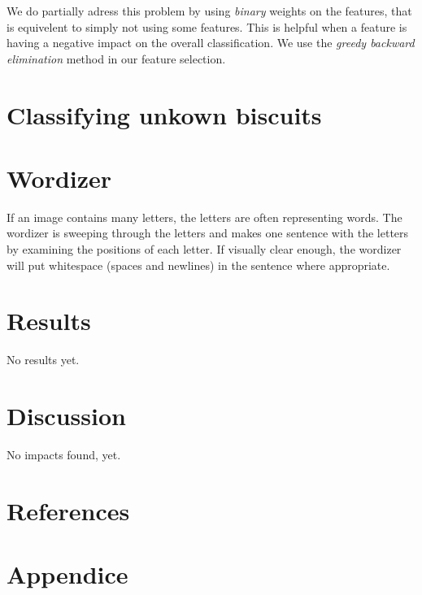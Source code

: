 \documentclass[a4paper,11pt]{article}
\begin{document}
We do partially adress this problem by using \emph{binary} weights on the features, 
that is equivelent to simply not using some features.
This is helpful when a feature is having a negative impact on the overall classification.
We use the \emph{greedy backward elimination} method in our feature selection.
\section{Classifying unkown biscuits}
\section{Wordizer}
If an image contains many letters, the letters are often representing words.
The wordizer is sweeping through the letters and makes one sentence with the letters by examining the positions of each letter.
If visually clear enough, the wordizer will put whitespace (spaces and newlines) in the sentence where appropriate.
\section{Results}
No results yet.
\section{Discussion}
No impacts found, yet.
\section{References}
\section{Appendice}
\end{document}
